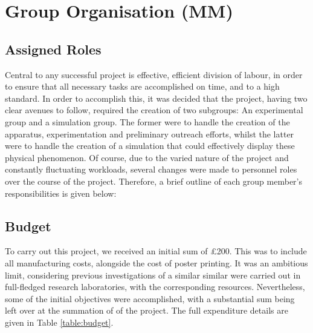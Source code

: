 \section{Group Organisation (MM)}
\subsection{Assigned Roles}
Central to any successful project is effective, efficient division of labour, in order to ensure that all necessary tasks are accomplished on time, and to a high standard. In order to accomplish this, it was decided that the project, having two clear avenues to follow, required the creation of two subgroups: An experimental group and a simulation group. The former were to handle the creation of the apparatus, experimentation and preliminary outreach efforts, whilst the latter were to handle the creation of a simulation that could effectively display these physical phenomenon. Of course, due to the varied nature of the project and constantly fluctuating workloads, several changes were made to personnel roles over the course of the project. Therefore, a brief outline of each group member's responsibilities is given below:


\subsection{Budget}
To carry out this project, we received an initial sum of \pounds200. This was to include all manufacturing costs, alongside the cost of poster printing. It was an ambitious limit, considering previous investigations of a similar similar were carried out in full-fledged research laboratories, with the corresponding resources. Nevertheless, some of the initial objectives were accomplished, with a substantial sum being left over at the summation of  of the project. The full expenditure details are given in Table \ref{table:budget}. 

\bigskip

